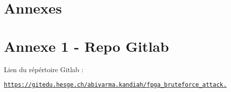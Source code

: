 \stopcontents[default]
\resumecontents[annexes]
\chapter*{Annexes}

\chapter*{Annexe 1 - Repo Gitlab}

Lien du répértoire Gitlab :

\href{https://gitedu.hesge.ch/abivarma.kandiah/fpga_bruteforce_attack}{\texttt{https://gitedu.hesge.ch/abivarma.kandiah/fpga\_bruteforce\_attack.}}

